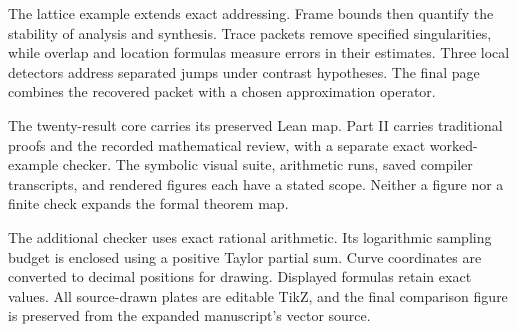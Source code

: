 \documentclass[11pt,letterpaper]{article}
\newcommand{\head}[1]{\par\vspace{2pt}{\sffamily\bfseries\normalsize #1}\par\vspace{1pt}}
\begin{document}
\head{A connected route}
The lattice example extends exact addressing. Frame bounds then quantify the
stability of analysis and synthesis. Trace packets remove specified singularities,
while overlap and location formulas measure errors in their estimates. Three
local detectors address separated jumps under contrast hypotheses. The final
page combines the recovered packet with a chosen approximation operator.
\head{Keep the evidence attached to its claim}
The twenty-result core carries its preserved Lean map. Part II carries
traditional proofs and the recorded mathematical review, with a separate exact
worked-example checker. The symbolic visual suite, arithmetic
runs, saved compiler transcripts, and rendered figures each have a stated
scope. Neither a figure nor a finite check expands the formal theorem map.
\head{What the example numbers mean}
The additional checker uses exact rational arithmetic. Its logarithmic sampling
budget is enclosed using a positive Taylor partial sum. Curve coordinates are
converted to decimal positions for drawing. Displayed formulas retain exact
values. All source-drawn plates are editable TikZ, and the final comparison
figure is preserved from the expanded manuscript's vector source.

\clearpage
{}
\begingroup
{}\fontsize{10}{12}\selectfont
\setlength{\parskip}{3pt}\setlength{\abovedisplayskip}{6pt}\setlength{\belowdisplayskip}{6pt}

\endgroup
\end{document}
